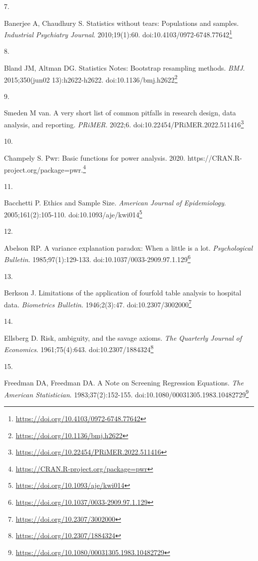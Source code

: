 \documentclass[
  a4paper,
]{book}
\newlength{\cslhangindent}
\newlength{\csllabelwidth}
\newlength{\cslentryspacingunit} %
\newenvironment{CSLReferences}[2] %
 {%
  \setlength{\parindent}{0pt}
  \ifodd #1
  \let\oldpar\par
  \def\par{\hangindent=\cslhangindent\oldpar}
  \fi
  \setlength{\parskip}{#2\cslentryspacingunit}
 }%
 {}
\newcommand{\CSLLeftMargin}[1]{\parbox[t]{\csllabelwidth}{#1}}
\newcommand{\CSLRightInline}[1]{\parbox[t]{\linewidth - \csllabelwidth}{#1}\break}
\renewcommand{\href}[2]{#2\footnote{\url{#1}}}
\begin{document}
\begin{CSLReferences}{0}{0}
\leavevmode{}%
\CSLLeftMargin{7. }%
\CSLRightInline{Banerjee A, Chaudhury S. Statistics without tears: Populations and samples. \emph{Industrial Psychiatry Journal}. 2010;19(1):60. doi:\href{https://doi.org/10.4103/0972-6748.77642}{10.4103/0972-6748.77642}}

\leavevmode{}%
\CSLLeftMargin{8. }%
\CSLRightInline{Bland JM, Altman DG. Statistics Notes: Bootstrap resampling methods. \emph{BMJ}. 2015;350(jun02 13):h2622-h2622. doi:\href{https://doi.org/10.1136/bmj.h2622}{10.1136/bmj.h2622}}

\leavevmode{}%
\CSLLeftMargin{9. }%
\CSLRightInline{Smeden M van. A very short list of common pitfalls in research design, data analysis, and reporting. \emph{PRiMER}. 2022;6. doi:\href{https://doi.org/10.22454/PRiMER.2022.511416}{10.22454/PRiMER.2022.511416}}

\leavevmode{}%
\CSLLeftMargin{10. }%
\CSLRightInline{Champely S. Pwr: Basic functions for power analysis. 2020. \href{https://CRAN.R-project.org/package=pwr}{https://CRAN.R-project.org/package=pwr.}}

\leavevmode{}%
\CSLLeftMargin{11. }%
\CSLRightInline{Bacchetti P. Ethics and Sample Size. \emph{American Journal of Epidemiology}. 2005;161(2):105-110. doi:\href{https://doi.org/10.1093/aje/kwi014}{10.1093/aje/kwi014}}

\leavevmode{}%
\CSLLeftMargin{12. }%
\CSLRightInline{Abelson RP. A variance explanation paradox: When a little is a lot. \emph{Psychological Bulletin}. 1985;97(1):129-133. doi:\href{https://doi.org/10.1037/0033-2909.97.1.129}{10.1037/0033-2909.97.1.129}}

\leavevmode{}%
\CSLLeftMargin{13. }%
\CSLRightInline{Berkson J. Limitations of the application of fourfold table analysis to hospital data. \emph{Biometrics Bulletin}. 1946;2(3):47. doi:\href{https://doi.org/10.2307/3002000}{10.2307/3002000}}

\leavevmode{}%
\CSLLeftMargin{14. }%
\CSLRightInline{Ellsberg D. Risk, ambiguity, and the savage axioms. \emph{The Quarterly Journal of Economics}. 1961;75(4):643. doi:\href{https://doi.org/10.2307/1884324}{10.2307/1884324}}

\leavevmode{}%
\CSLLeftMargin{15. }%
\CSLRightInline{Freedman DA, Freedman DA. A Note on Screening Regression Equations. \emph{The American Statistician}. 1983;37(2):152-155. doi:\href{https://doi.org/10.1080/00031305.1983.10482729}{10.1080/00031305.1983.10482729}}


\end{CSLReferences}
\end{document}
